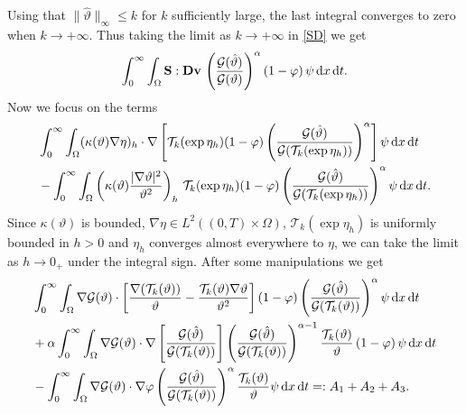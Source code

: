 \documentclass[11pt, a4paper, reqno]{amsart}
\numberwithin{equation}{section}
\newcommand{\thetah}{\hat\thet}
\newcommand{\vc}[1]{{\bf #1}}
\newcommand{\vv}{\vc{v}}
\newcommand{\thet}{\vartheta}
\renewcommand{\S}{\mathbf{S}}
\newcommand{\D}{\mathbf{D}}
\newcommand{\dt}{\,{\rm d} t }
\newcommand{\dx}{\,{\rm d} {x}}
\newcommand{\G}{\mathcal{G}}
\newcommand{\al}{\alpha}
\newcommand{\intnO}[1]{\int_0^{\infty}\intO{ #1 }\dt}
\newcommand{\intO}[1]{\int_{\Omega} #1 \dx}
\begin{document}
Using that $\|\thetah\|_\infty\leq k$ for $k$ sufficiently large, the last integral converges to zero when $k\to +\infty$. Thus taking the limit as $k\to +\infty$ in \eqref{SD} we get
$$
\intnO{  \S:\D{\vv}\,  \left(\frac{\G(\thetah)}{\G(\thet)}\right)^{\al} (1- \varphi)\,\psi}.
$$
Now we focus on the terms
\begin{equation*}
\begin{split}
&\intnO{(\kappa(\thet)\nabla\eta)_h \cdot\nabla \left[ \mathcal{T}_k(\exp{\eta_h})(1-\varphi) \left(\frac{\G(\thetah)}{\G(\mathcal{T}_k(\exp{\eta_h}))}\right)^{\al} \right]\psi } \\
&- \intnO{\left(\kappa(\thet)\frac{|\nabla\thet|^2}{\thet^2}\right)_h\, \mathcal{T}_k(\exp{\eta_h})(1- \varphi) \left(\frac{\G(\thetah)}{\G(\mathcal{T}_k(\exp{\eta_h}))}\right)^{\al} \psi}.
\end{split}
\end{equation*}
Since $\kappa(\thet)$ is bounded, $\nabla\eta\in L^2((0, T)\times\Omega)$, $\mathcal{T}_k(\exp{\eta_h})$ is uniformly bounded in $h>0$ and $\eta_h$ converges almost everywhere to $\eta$, we can take the limit as $h\to 0_+$ under the integral sign. After some manipulations we get
\begin{equation*}
\begin{split}
&\intnO{\nabla \G(\thet)\cdot \left[\frac{\nabla (\mathcal{T}_k(\thet))}{\thet} -\frac{\mathcal{T}_k(\thet)\nabla\thet}{\thet^2}\right] (1-\varphi) \left(\frac{\G(\thetah)}{\G(\mathcal{T}_k(\thet))}\right)^{\al} \psi} \\
&+\al\intnO{\nabla \G(\thet) \cdot \nabla\left[ \frac{\G(\thetah)}{\G(\mathcal{T}_k(\thet))}\right]\left( \frac{\G(\thetah)}{\G(\mathcal{T}_k(\thet))}\right)^{\al-1}\frac{\mathcal{T}_k(\thet)}{\thet}\,(1-\varphi)\,\psi}\\
&-\intnO{\nabla \G(\thet)\cdot \nabla\varphi  \left(\frac{\G(\thetah)}{\G(\mathcal{T}_k(\thet))}\right)^{\al}\frac{\mathcal{T}_k(\thet)}\thet \psi} =:A_1+A_2+A_3.
\end{split}
\end{equation*}
\end{document}
